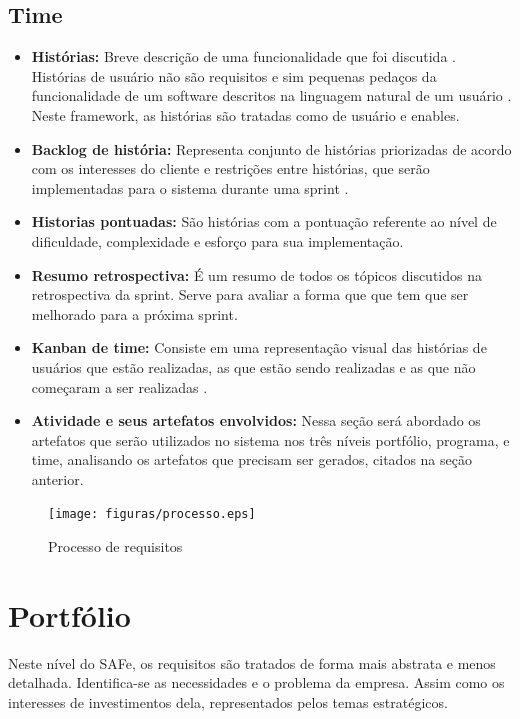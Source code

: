 \subsection{Time}
\begin{itemize}
    \item \textbf{ Histórias:} Breve descrição de uma funcionalidade que foi discutida \cite{leffingwell}. Histórias de usuário não são requisitos e sim pequenas pedaços da funcionalidade de um software descritos na linguagem natural de um usuário \cite{safe}. Neste framework, as histórias são tratadas como de usuário e enables.
    \item \textbf{ Backlog de história:} Representa conjunto de histórias priorizadas de acordo com os interesses do cliente e restrições entre histórias, que serão implementadas para o sistema durante uma sprint \cite{safe}.
    \item \textbf{ Historias pontuadas:} São histórias com a pontuação referente ao nível de dificuldade, complexidade e esforço para sua implementação.
    \item \textbf{ Resumo retrospectiva:} É um resumo de todos os tópicos discutidos na retrospectiva da sprint. Serve para avaliar a forma que que tem que ser melhorado para a próxima sprint.
    \item \textbf{ Kanban de time:} Consiste em uma representação visual das histórias de usuários que estão realizadas, as que estão sendo realizadas e as que não começaram a ser realizadas \cite{leffingwell}.
    \item \textbf{ Atividade e seus artefatos envolvidos:} Nessa seção será abordado os artefatos que serão utilizados no sistema nos três níveis portfólio, programa, e time, analisando os artefatos que precisam ser gerados, citados na seção anterior.
\end{itemize}

\begin{figure}[H]
    \centering
    \caption{Processo de requisitos}
    \label{processo}
    \texttt{[image: figuras/processo.eps]}
\end{figure}




\section{Portfólio}

Neste nível do SAFe, os requisitos são tratados de forma mais abstrata e menos detalhada. Identifica-se as necessidades e o problema da empresa. Assim como os interesses de investimentos dela, representados pelos temas estratégicos.

